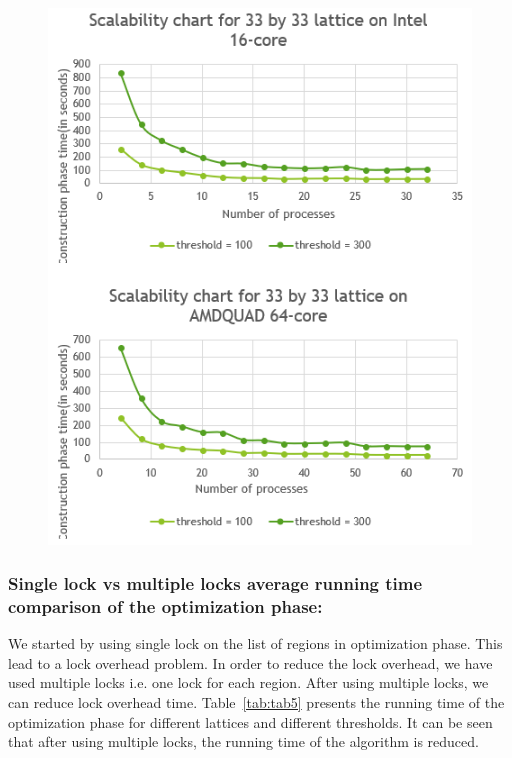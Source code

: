 \documentclass[conference]{IEEEtran}
\begin{document}
\begin{figure}[h]
\includegraphics[scale=0.85]{scale33.png}
\end{figure}

\subsubsection*{Single lock vs multiple locks average running time comparison of the optimization phase:}
We started by using single lock on the list of regions in optimization phase.
This lead to a lock overhead problem. In order to reduce the lock overhead, we have
used multiple locks i.e. one lock for each region. After using multiple locks,
we can reduce lock overhead time. Table~\ref{tab:tab5} presents the
running time of the optimization phase for different lattices and different
thresholds. It can be seen that after using multiple locks, the running time of the algorithm is reduced.
\end{document}
